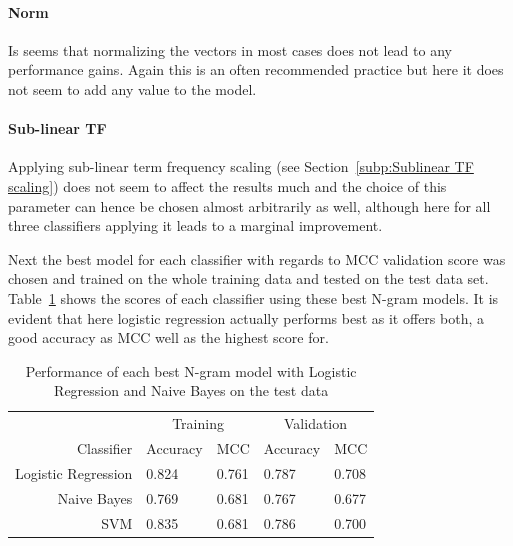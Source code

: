 \paragraph{Norm}
\label{par:Norm}
Is seems that normalizing the vectors in most cases does not lead to any performance gains. Again this is an often recommended practice but here it does not seem to add any value to the model.


\paragraph{Sub-linear TF}
\label{par:Sub-linear TF}
Applying sub-linear term frequency scaling (see Section~\ref{subp:Sublinear TF scaling}) does not seem to affect the results much and the choice of this parameter can hence be chosen almost arbitrarily as well, although here for all three classifiers applying it leads to a marginal improvement.
\bigskip

Next the best model for each classifier with regards to \gls{MCC} validation score was chosen and trained on the whole training data and tested on the test data set. Table~\ref{tab:Ngram Grid Search Scores} shows the scores of each classifier using these best N-gram models. It is evident that here logistic regression actually performs best as it offers both, a good accuracy as \gls{MCC} well as the highest score for.

\begin{table}[h]
  \begin{center}
  \begin{tabular}{ r | *2l | *2l }
    \toprule
     & \multicolumn{2}{c|}{Training} & \multicolumn{2}{c}{Validation}\\
    Classifier & Accuracy & MCC & Accuracy & MCC \\
    \midrule
    Logistic Regression & 0.824 & 0.761 & 0.787 & 0.708 \\
    Naive Bayes         & 0.769 & 0.681 & 0.767 & 0.677 \\
    SVM                 & 0.835 & 0.681 & 0.786 & 0.700 \\
    \bottomrule
  \end{tabular}
  \caption{Performance of each best N-gram model with Logistic Regression and Naive Bayes on the test data}
\label{tab:Ngram Grid Search Scores}
\end{center}
\end{table}

